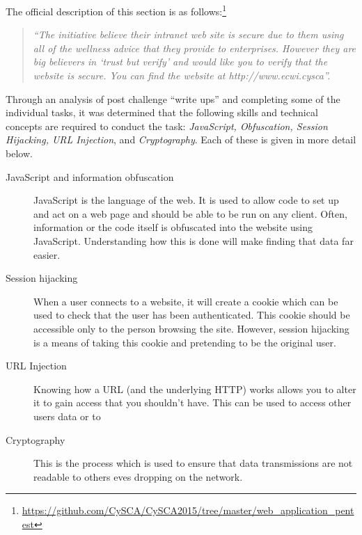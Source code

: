 \documentclass[a4paper,11pt]{report}
\begin{document}
			The official description of this section is as follows:\footnote{\url{https://github.com/CySCA/CySCA2015/tree/master/web\_application\_pentest}}
			\begin{quote}
				\textit{
				``The initiative believe their intranet web site is secure due to them using all of the wellness advice that they provide to enterprises. However they are big believers in `trust but verify' and would like you to verify that the website is secure. You can find the website at http://www.ecwi.cysca''. }
			\end{quote}

			Through an analysis of post challenge ``write ups'' and completing some of the individual tasks, 
			it was determined that the following skills and technical concepts are required to conduct the task: 
			\textit{JavaScript, Obfuscation, Session Hijacking, URL Injection}, and \textit{Cryptography}. 
			Each of these is given in more detail below. 
			\begin{description}
				\item[JavaScript and information obfuscation]
					JavaScript is the language of the web. It is used to allow code to set up and act on a web page and should be able to be run on any client. 
					Often, information or the code itself is obfuscated into the website using JavaScript.
					Understanding how this is done will make finding that data far easier. 
				\item[Session hijacking]
					When a user connects to a website, it will create a cookie which can be used to check that the user has been authenticated. 
					This cookie should be accessible only to the person browsing the site. 
					However, session hijacking is a means of taking this cookie and pretending to be the original user. 
				\item[URL Injection]
					Knowing how a URL (and the underlying HTTP) works allows you to alter it to gain access that you shouldn't have. 
					This can be used to access other users data or to 
				\item[Cryptography]
					This is the process which is used to ensure that data transmissions are not readable to others eves dropping on the network. 
			\end{description}
\end{document}
